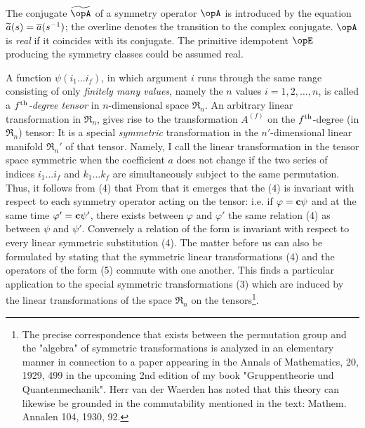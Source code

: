 \begin{paper}{1}
The conjugate $\adj{\opA}$ of a symmetry operator $\opA$ is introduced by the equation $\widetilde{a}(s)=\overline{a}({s}^{-1})$; the overline denotes the transition to the complex conjugate. $\opA$ is \textit{real} if it coincides with its conjugate. The primitive idempotent $\opE$ producing the symmetry classes could be assumed real.

A function $\psi(i_1\dots i_f)$, in which argument $i$ runs through the same range consisting of only \textit{finitely many values}, namely the $n$ values $i=1,2,\dots,n$, is called a ${f}^\text{th}$\textit{-degree tensor} in $n$-dimensional space $\mathfrak{R}_n$. An arbitrary linear transformation in $\mathfrak{R}_n$,
gives rise to the transformation $A^{(f)}$ on the ${f}^\text{th}$-degree (in $\mathfrak{R}_n$) tensor:
It is a special \textit{symmetric} transformation in the $n'$-dimensional linear manifold $\mathfrak{R}_n'$ of that tensor. Namely, I call the linear transformation
in the tensor space symmetric when the coefficient $a$ does not change if the two series of indices $i_1\dots i_f$ and $k_1\dots k_f$ are simultaneously subject to the same permutation. Thus, it follows from (4) that
From that it emerges that the  (4) is invariant with respect to each symmetry operator acting on the tensor:
i.e. if $\varphi=\mathbf{c}\psi$ and at the same time $\varphi'=\mathbf{c}\psi'$, there exists between $\varphi$ and $\varphi'$ the same relation (4) as between $\psi$ and $\psi'$. Conversely a relation of the form
is invariant with respect to every linear symmetric substitution (4). The matter before us can also be formulated by stating that the symmetric linear transformations (4) and the operators of the form (5) commute with one another. This finds a particular application to the special symmetric transformations (3) which are induced by the linear transformations of the space $\mathfrak{R}_n$ on the tensors\footnote{The precise correspondence that exists between the permutation group and the "algebra" of symmetric transformations is analyzed in an elementary manner in connection to a paper appearing in the Annals of Mathematics, 20, 1929, 499 in the upcoming 2nd edition of my book "Gruppentheorie und Quantenmechanik". Herr van der Waerden has noted that this theory can likewise be grounded in the commutability mentioned in the text: Mathem. Annalen 104, 1930, 92.}.


\end{paper}
